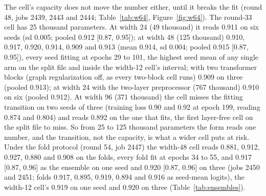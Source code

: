 


The cell's capacity does not move the number either, until it breaks the fit (round
48, jobs 2439, 2443 and 2444; Table~\ref{tab:w64}, Figure~\ref{fig:w64}). The
round-33 cell has 25 thousand parameters. At width 24 (49 thousand) it reads 0.911
on six seeds (sd 0.005; pooled 0.912 [0.87, 0.95]); at width 48 (125 thousand) 0.910,
0.917, 0.920, 0.914, 0.909 and 0.913 (mean 0.914, sd 0.004; pooled 0.915 [0.87,
0.95]), every seed fitting at epochs 29 to 101, the highest seed mean of any single
arm on the split file and inside the width-12 cell's interval; with two transformer
blocks (graph regularization off, as every two-block cell runs) 0.909 on three
(pooled 0.913); at width 24 with the two-layer preprocessor (767 thousand) 0.910 on
six (pooled 0.912). At width 96 (371 thousand) the cell misses the fitting transition
on two seeds of three (training loss 0.90 and 0.92 at epoch 199, reading 0.874 and
0.804) and reads 0.892 on the one that fits, the first layer-free cell on the split
file to miss. So from 25 to 125 thousand parameters the form reads one number, and
the transition, not the capacity, is what a wider cell puts at risk. Under the fold
protocol (round 54, job 2447) the width-48 cell reads 0.881, 0.912, 0.927, 0.880 and
0.908 on the folds, every fold fit at epochs 34 to 55, and 0.917 [0.87, 0.96] as the
ensemble on one seed and 0.920 [0.87, 0.96] on three (jobs 2450 and 2451; folds
0.917, 0.895, 0.919, 0.894 and 0.916 as seed-mean logits), the width-12 cell's 0.919
on one seed and 0.920 on three (Table~\ref{tab:ensembles}).




